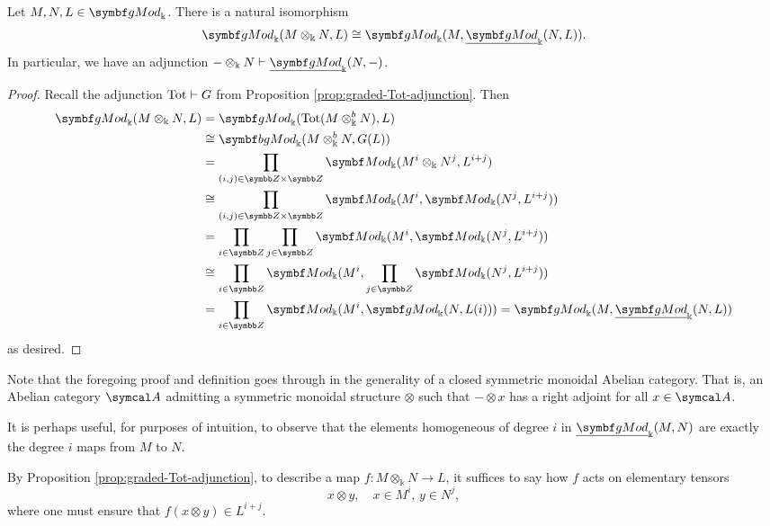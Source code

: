 \begin{proposition}\label{prop:graded-tensor-hom-adjunction}
	Let \(M,N,L\in\gMod_\Bbbk\). There is a natural isomorphism
	\[ \gMod_\Bbbk(M\otimes_\Bbbk N, L) \cong \gMod_\Bbbk(M,\ugMod_\Bbbk(N,L)). \]
	In particular, we have an adjunction \(-\otimes_\Bbbk N \ladj \ugMod_\Bbbk(N,-)\).
\end{proposition}
\begin{proof}
Recall the adjunction \(\operatorname{Tot}\vdash G\) from Proposition \ref{prop:graded-Tot-adjunction}. Then
\begin{align*}
	\gMod_\Bbbk(M\otimes_\Bbbk N, L) &= \gMod_{\Bbbk}(\Tot(M\otimes_\Bbbk^b N),L) \\
	&\cong \bgMod_{\Bbbk}(M\otimes_\Bbbk^b N,G(L)) \\
	&= \prod_{(i,j)\in\Z\times\Z}\Mod_{\Bbbk}(M^i\otimes_\Bbbk N^j,L^{i+j}) \\
	&\cong \prod_{(i,j)\in\Z\times\Z}\Mod_{\Bbbk}(M^i,\Mod_\Bbbk(N^j,L^{i+j})) \\
	&= \prod_{i\in\Z}\prod_{j\in\Z}\Mod_{\Bbbk}(M^i,\Mod_\Bbbk(N^j,L^{i+j})) \\
	&\cong \prod_{i\in\Z}\Mod_{\Bbbk}(M^i, \prod_{j\in\Z}\Mod_\Bbbk(N^j,L^{i+j})) \\
	&= \prod_{i\in\Z}\Mod_{\Bbbk}(M^i, \gMod_\Bbbk(N,L(i))) = \gMod_\Bbbk(M,\ugMod_\Bbbk(N,L))
\end{align*}
as desired.
\end{proof}
\begin{remark}
	Note that the foregoing proof and definition goes through in the generality of a closed symmetric monoidal Abelian category. That is,
	an Abelian category \(\calA\) admitting a symmetric monoidal structure \(\otimes\) such that \(-\otimes x\) has a right adjoint for all \(x\in\calA\).
\end{remark}

\begin{remark}
	It is perhaps useful, for purposes of intuition, to observe that the elements homogeneous of degree \(i\) in \(\ugMod_\Bbbk(M,N)\) are exactly the degree \(i\) maps from \(M\) to \(N\).
\end{remark}

\begin{remark}
	By Proposition \ref{prop:graded-Tot-adjunction}, to describe a map \(f\!:M\otimes_\Bbbk N \to L\), it suffices to say how \(f\) acts on elementary tensors
	\[ x\otimes y,\quad x\in M^i,\, y\in N^j, \]
	where one must ensure that \(f(x\otimes y) \in L^{i+j}\).
\end{remark}

